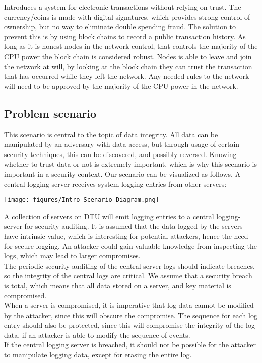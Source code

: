 Introduces a system for electronic transactions without relying on
trust. The currency/coins is made with digital signatures, which
provides strong control of ownership, but no way to eliminate double
spending fraud. The solution to prevent this is by using block chains
to record a public transaction history. As long as it is honest nodes
in the network control, that controls the majority of the CPU power
the block chain is considered robust. Nodes is able to leave and join
the network at will, by looking at the block chain they can trust the
transaction that has occurred while they left the network. Any needed
rules to the network will need to be approved by the majority of the
CPU power in the network.~\cite{nakamoto}


\subsection{Problem scenario}

This scenario is central to the topic of data integrity. All data can be manipulated by an adversary with data-access, but through usage of certain security techniques, this can be discovered, and possibly reversed. Knowing whether to trust data or not is extremely important, which is why this scenario is important in a security context.
Our scenario can be visualized as follows. A central logging server receives system logging entries from other servers:
\\

\begin{center}
    \texttt{[image: figures/Intro\_Scenario\_Diagram.png]}
\end{center}

A collection of servers on DTU will emit logging entries to a central logging-server for security auditing. It is assumed that the data logged by the servers have intrinsic value, which is interesting for potential attackers, hence the need for secure logging. An attacker could gain valuable knowledge from inspecting the logs, which may lead to larger compromises.
\\The periodic security auditing of the central server logs should indicate breaches, so the integrity of the central logs are critical.
We assume that a security breach is total, which means that all data stored on a server, and key material is compromised.
\\When a server is compromised, it is imperative that log-data cannot be modified by the attacker, since this will obscure the compromise.
The sequence for each log entry should also be protected, since this will compromise the integrity of the log-data, if an attacker is able to modify the sequence of events.
\\If the central logging server is breached, it should not be possible for the attacker to manipulate logging data, except for erasing the entire log.

